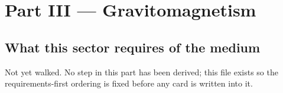 \part{Part III --- Gravitomagnetism}

\chapter{What this sector requires of the medium}

Not yet walked. No step in this part has been derived; this file exists so the
requirements-first ordering is fixed before any card is written into it.
